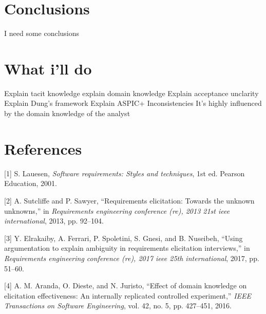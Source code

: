 \documentclass[]{llncs}
\begin{document}
\hypertarget{conclusions}{%
\section{Conclusions}\label{conclusions}}

I need some conclusions

\hypertarget{what-ill-do}{%
\section{What i'll do}\label{what-ill-do}}

Explain tacit knowledge explain domain knowledge Explain acceptance
unclarity Explain Dung's framework Explain ASPIC+ Inconsistencies It's
highly influenced by the domain knowledge of the analyst

\newpage

\hypertarget{references}{%
\section*{References}\label{references}}

\hypertarget{refs}{}
\leavevmode\hypertarget{ref-lauesen2001softwarereq}{}%
{[}1{]} S. Lauesen, \emph{Software requirements: Styles and techniques},
1st ed. Pearson Education, 2001.

\leavevmode\hypertarget{ref-sutcliffe2013requirements}{}%
{[}2{]} A. Sutcliffe and P. Sawyer, ``Requirements elicitation: Towards
the unknown unknowns,'' in \emph{Requirements engineering conference
(re), 2013 21st ieee international}, 2013, pp. 92--104.

\leavevmode\hypertarget{ref-elrakaiby2017using}{}%
{[}3{]} Y. Elrakaiby, A. Ferrari, P. Spoletini, S. Gnesi, and B.
Nuseibeh, ``Using argumentation to explain ambiguity in requirements
elicitation interviews,'' in \emph{Requirements engineering conference
(re), 2017 ieee 25th international}, 2017, pp. 51--60.

\leavevmode\hypertarget{ref-aranda2016effect}{}%
{[}4{]} A. M. Aranda, O. Dieste, and N. Juristo, ``Effect of domain
knowledge on elicitation effectiveness: An internally replicated
controlled experiment,'' \emph{IEEE Transactions on Software
Engineering}, vol. 42, no. 5, pp. 427--451, 2016.
\end{document}
